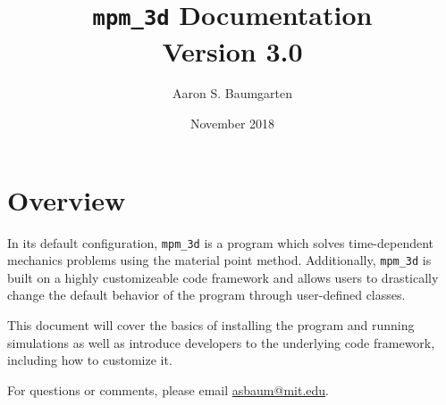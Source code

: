 \documentclass[12pt]{report}
\begin{document}
\title{\texttt{mpm\_3d} Documentation \\ \large Version 3.0}
\author{Aaron S. Baumgarten}
\date{November 2018}
\maketitle

\tableofcontents

\chapter{Overview}
In its default configuration, \texttt{mpm\_3d} is a program which solves time-dependent mechanics problems using the material point method. Additionally, \texttt{mpm\_3d} is built on a highly customizeable code framework and allows users to drastically change the default behavior of the program through user-defined classes.

This document will cover the basics of installing the program and running simulations as well as introduce developers to the underlying code framework, including how to customize it.

For questions or comments, please email \href{mailto: asbaum@mit.edu}{asbaum@mit.edu}.

\pagebreak










\end{document}
